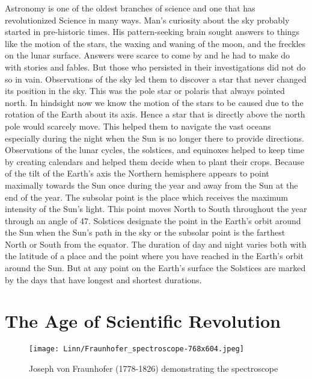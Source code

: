 \documentclass{../template/texnote}
\begin{document}
Astronomy is one of the oldest branches of science and one that has revolutionized Science in many ways. Man's curiosity about the sky probably started in pre-historic times. His pattern-seeking brain sought answers to things like the motion of the stars, the waxing and waning of the moon, and the freckles on the lunar surface. Answers were scarce to come by and he had to make do with stories and fables. But those who persisted in their investigations did not do so in vain. Observations of the sky led them to discover a star that never changed its position in the sky. This was the pole star or polaris that always pointed north. In hindsight now we know the motion of the stars to be caused due to the rotation of the Earth about its axis. Hence a star that is directly above the north pole would scarcely move. This helped them to navigate the vast oceans especially during the night when the Sun is no longer there to provide directions. Observations of the lunar cycles, the solstices, and equinoxes helped to keep time by creating calendars and helped them decide when to plant their crops. Because of the tilt of the Earth's axis the Northern hemisphere appears to point maximally towards the Sun once during the year and away from the Sun at the end of the year. The subsolar point is the place which receives the maximum intensity of the Sun's light. This point moves North to South throughout the year through an angle of 47\textdegree. Solstices designate the point in the Earth's orbit around the Sun when the Sun's path in the sky or the subsolar point is the farthest North or South from the equator. The duration of day and night varies both with the latitude of a place and the point where you have reached in the Earth's orbit around the Sun. But at any point on the Earth's surface the Solstices are marked by the days that have longest and shortest durations. 


\section{The Age of Scientific Revolution}

\begin{figure}
    \centering
    \texttt{[image: Linn/Fraunhofer\_spectroscope-768x604.jpeg]}
    \caption{Joseph von Fraunhofer (1778-1826) demonstrating the spectroscope}
    \label{fig:spectroscope}
\end{figure}
\end{document}
